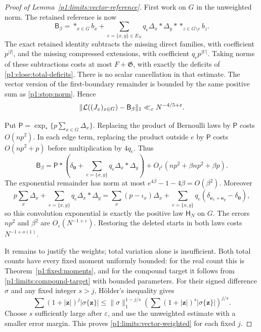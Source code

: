 \begin{proof}[Proof of Lemma~\ref{p1:limits:vector-reference}]
First work on $G$ in the unweighted norm.  The retained reference
is now
\[
 \mathsf B_\beta=\mathop{*}_{x\in G}b_x+
       \sum_{e=\{x,y\}\in E_N}q_e\Delta_x*\Delta_y*
                                      \mathop{*}_{z\in G\setminus e}b_z.
\]
The exact retained identity subtracts the missing direct
families, with coefficient $p^{|I|}$, and the missing compressed
extensions, with coefficient $q_ep^{|U|}$.  Taking norms of
these subtractions costs at most $F+\mathfrak G$, with exactly
the deficits of \eqref{p1:close:total-deficits}.  There is no
scalar cancellation in that estimate.  The vector version of
the first-boundary remainder is bounded by the same positive
sum as \eqref{p1:stop:norm}.  Hence
\[
 \|\mathcal L((J_x)_{x\in G})-\mathsf B_\beta\|_1
       \ll_\varepsilon N^{-4/5+\varepsilon}.
\]

Put $\mathsf P=\exp_*\{p\sum_{x\in G}\Delta_x\}$.
Replacing the product of Bernoulli laws by $\mathsf P$ costs
$O(np^2)$.  In each edge term, replacing the product outside
$e$ by $\mathsf P$ costs $O(np^2+p)$ before multiplication
by $4q_e$.  Thus
\[
 \mathsf B_\beta=
 \mathsf P*\left(\delta_{\boldsymbol0}
                     +\sum_{e=\{x,y\}}q_e\Delta_x*\Delta_y\right)
              +O_{\ell^1}(np^2+\beta np^2+\beta p).
\]
The exponential remainder has norm at most
$e^{4\beta}-1-4\beta=O(\beta^2)$.  Moreover
\[
 p\sum_x\Delta_x+\sum_{e=\{x,y\}}q_e\Delta_x*\Delta_y
 =\sum_x(p-\iota_x)\Delta_x+
       \sum_{e=\{x,y\}}q_e
                    (\delta_{\boldsymbol e_x+\boldsymbol e_y}
                                      -\delta_{\boldsymbol0}),
\]
so this convolution exponential is exactly the positive law
$\mathsf H_N$ on $G$.  The errors $np^2$ and $\beta^2$ are
$O_\varepsilon(N^{-1+\varepsilon})$.  Restoring the deleted
starts in both laws costs $N^{-1+o(1)}$.

It remains to justify the weights; total variation alone is
insufficient.  Both total counts have every fixed moment
uniformly bounded: for the real count this is
Theorem~\ref{p1:fixed:moments}, and for the compound target
it follows from \eqref{p1:limits:compound-target} with bounded
parameters.  For their signed difference $\sigma$ and any fixed
integer $s>j$, H\"older's inequality gives
\[
 \sum(1+|\boldsymbol z|)^j|\sigma\{\boldsymbol z\}|
 \le\|\sigma\|_1^{1-j/s}
       \left(\sum(1+|\boldsymbol z|)^s
                         |\sigma\{\boldsymbol z\}|\right)^{j/s}.
\]
Choose $s$ sufficiently large after $\varepsilon$, and use the
unweighted estimate with a smaller error margin.  This proves
\eqref{p1:limits:vector-weighted} for each fixed $j$.
\end{proof}

